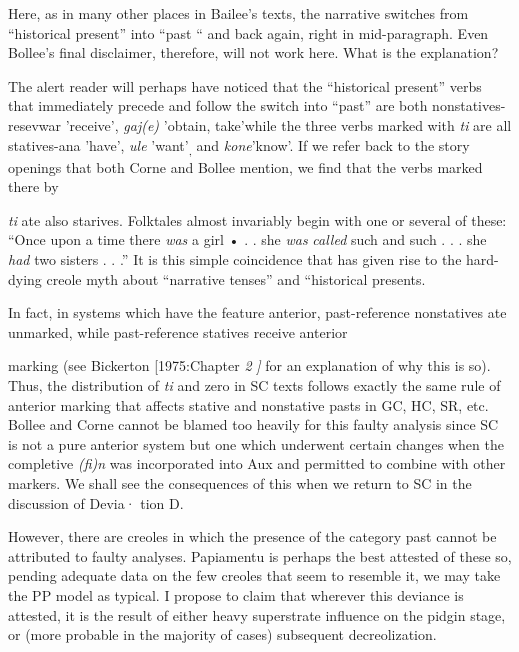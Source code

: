 Here, as in many other places in Bailee's texts, the narrative switches from ``historical present'' into ``past `` and back again, right in mid-paragraph. Even Bollee's final disclaimer, therefore, will not work here. What is the explanation?

The alert reader will perhaps have noticed that the ``historical present'' verbs that immediately precede and follow the switch into ``past'' are both nonstatives- resevwar 'receive', \textit{gaj(e)} 'obtain, take'\-while the three verbs marked with \textit{ti} are all statives{}-ana 'have', \textit{ule}
'want'\textsubscript{,} and \textit{kone}'know'. If we refer back to the story openings that
both Corne and Bollee mention, we find that the verbs marked there by

\textit{ti} ate also starives. Folktales almost invariably begin with one or several of these: ``Once upon a time there \textit{was }a girl • . . she \textit{was} \textit{called} such and such . . . she \textit{had} two sisters . . .'' It is this simple coincidence that has given rise to the hard-dying creole myth about ``narrative tenses'' and ``historical presents.{\textquotedbl}

In fact, in systems which have the feature anterior, past-reference nonstatives ate unmarked, while past-reference statives receive anterior



marking (see Bickerton [1975:Chapter \textit{2} \textit{]} for an explanation of why this is so). Thus, the distribution of \textit{ti} and zero in SC texts follows exactly the same rule of anterior marking that affects stative and nonstative pasts in GC, HC, SR, etc.
Bollee and Corne cannot be blamed too heavily for this faulty analysis since SC is not a pure anterior system but one which under\-went certain changes when the completive \textit{(fi)n} was incorporated into Aux and permitted to combine with other markers. We shall see the
consequences of this when we return to SC in the discussion of Devia· tion D.

However, there are creoles in which the presence of the category past cannot be attributed to faulty analyses. Papiamentu is perhaps the best attested of these so, pending adequate data on the few creoles that seem to resemble it, we may take the PP model as typical. I pro\-pose to claim that wherever this deviance is attested, it is the result of either heavy superstrate influence on the pidgin stage, or (more prob\-able in the majority of cases) subsequent decreolization.

